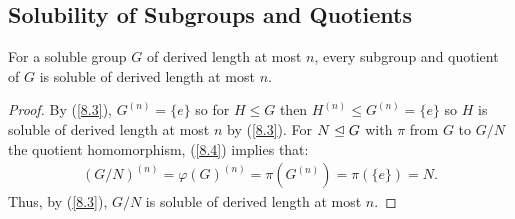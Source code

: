 \subsection{Solubility of Subgroups and Quotients} \label{8.5}

For a soluble group $G$ of derived length at most $n$, every
subgroup and quotient of $G$ is soluble of derived length at
most $n$.

\begin{proof}
    By (\ref{8.3}), $G^(n) = \{e\}$ so for $H \leq G$ then
    $H^(n) \leq G^(n) = \{e\}$ so $H$ is soluble of derived
    length at most $n$ by (\ref{8.3}). For $N \trianglelefteq G$
    with $\pi$ from $G$ to $G / N$ the quotient homomorphism,
    (\ref{8.4}) implies that: \begin{align*}
        (G / N)^{(n)} = \varphi(G)^{(n)} = \pi(G^(n)) 
        = \pi(\{e\}) = N. \tag{8.4}
    \end{align*} Thus, by (\ref{8.3}), $G / N$ is soluble 
    of derived length at most $n$.
\end{proof}
